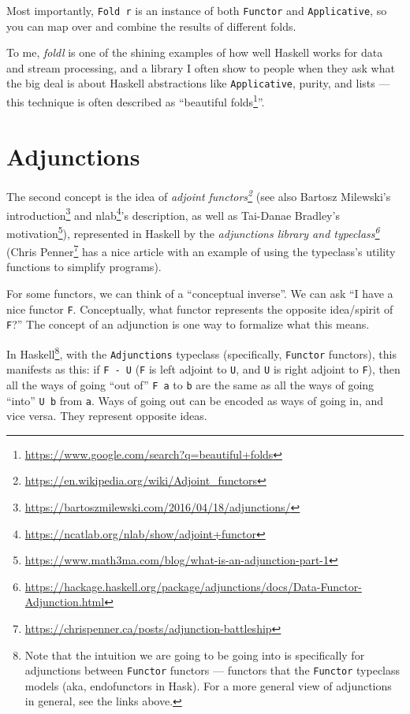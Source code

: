 \documentclass[]{article}
\renewcommand{\href}[2]{#2\footnote{\url{#1}}}
\begin{document}
Most importantly, \texttt{Fold\ r} is an instance of both \texttt{Functor} and
\texttt{Applicative}, so you can map over and combine the results of different
folds.

To me, \emph{foldl} is one of the shining examples of how well Haskell works for
data and stream processing, and a library I often show to people when they ask
what the big deal is about Haskell abstractions like \texttt{Applicative},
purity, and lists --- this technique is often described as
``\href{https://www.google.com/search?q=beautiful+folds}{beautiful folds}''.

\hypertarget{adjunctions}{%
\section{Adjunctions}\label{adjunctions}}

The second concept is the idea of
\emph{\href{https://en.wikipedia.org/wiki/Adjoint_functors}{adjoint functors}}
(see also \href{https://bartoszmilewski.com/2016/04/18/adjunctions/}{Bartosz
Milewski's introduction} and
\href{https://ncatlab.org/nlab/show/adjoint+functor}{nlab}'s description, as
well as
\href{https://www.math3ma.com/blog/what-is-an-adjunction-part-1}{Tai-Danae
Bradley's motivation}), represented in Haskell by the
\emph{\href{https://hackage.haskell.org/package/adjunctions/docs/Data-Functor-Adjunction.html}{adjunctions
library and typeclass}}
(\href{https://chrispenner.ca/posts/adjunction-battleship}{Chris Penner} has a
nice article with an example of using the typeclass's utility functions to
simplify programs).

For some functors, we can think of a ``conceptual inverse''. We can ask ``I have
a nice functor \texttt{F}. Conceptually, what functor represents the opposite
idea/spirit of \texttt{F}?'' The concept of an adjunction is one way to
formalize what this means.

In Haskell\footnote{Note that the intuition we are going to be going into is
  specifically for adjunctions between \texttt{Functor} functors --- functors
  that the \texttt{Functor} typeclass models (aka, endofunctors in Hask). For a
  more general view of adjunctions in general, see the links above.}, with the
\texttt{Adjunctions} typeclass (specifically, \texttt{Functor} functors), this
manifests as this: if \texttt{F\ -\textbar{}\ U} (\texttt{F} is left adjoint to
\texttt{U}, and \texttt{U} is right adjoint to \texttt{F}), then all the ways of
going ``out of'' \texttt{F\ a} to \texttt{b} are the same as all the ways of
going ``into'' \texttt{U\ b} from \texttt{a}. Ways of going out can be encoded
as ways of going in, and vice versa. They represent opposite ideas.
\end{document}
